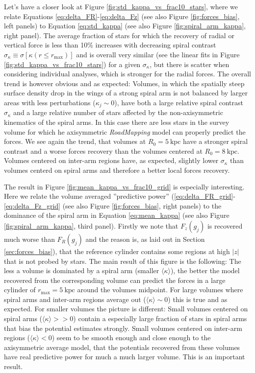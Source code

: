 \documentclass[iop,revtex4,numberedappendix,appendixfloats]{emulateapj}
\newcommand{\RM}{{\sl RoadMapping}}
\begin{document}
Let's have a closer look at Figure \ref{fig:std_kappa_vs_frac10_stars}, where we relate Equations \eqref{eq:delta_FR}-\eqref{eq:delta_Fz} (see also Figure \ref{fig:forces_bias}, left panels) to Equation \eqref{eq:std_kappa} (see also Figure \ref{fig:spiral_arm_kappa}, right panel). The average fraction of stars for which the recovery of radial or vertical force is less than 10\% increases with decreasing spiral contrast $\sigma_\kappa \equiv \sigma[\kappa(r \leq r_\text{max})]$ and is overall very similar (see the linear fits in Figure \ref{fig:std_kappa_vs_frac10_stars}) for a given $\sigma_\kappa$, but there is scatter when considering individual analyses, which is stronger for the radial forces. The overall trend is however obvious and as expected: Volumes, in which the spatially steep surface density drop in the wings of a strong spiral arm is not balanced by larger areas with less perturbations ($\kappa_j \sim 0$), have both a large relative spiral contrast $\sigma_\kappa$ and a large relative number of stars affected by the non-axisymmetric kinematics of the spiral arms. In this case there are less stars in the survey volume for which he axisymmetric \RM{} model can properly predict the forces. We see again the trend, that volumes at $R_0=5~\text{kpc}$ have a stronger spiral contrast and a worse forces recovery than the volumes centered at $R_0=8~\text{kpc}$. Volumes centered on inter-arm regions have, as expected, slightly lower $\sigma_\kappa$ than volumes centerd on spiral arms and therefore a better local forces recovery.

The result in Figure \ref{fig:mean_kappa_vs_frac10_grid} is especially interesting. Here we relate the volume averaged ''predictive power'' (\eqref{eq:delta_FR_grid}-\eqref{eq:delta_Fz_grid} (see also Figure \ref{fig:forces_bias}, right panels) to the dominance of the spiral arm in Equation \eqref{eq:mean_kappa} (see also Figure \ref{fig:spiral_arm_kappa}, third panel). Firstly we note that $F_z(g_j)$ is recovered much worse than $F_R(g_j)$ and the reason is, as laid out in Section \ref{sec:forces_bias}), that the reference cylinder contains some regions at high $|z|$ that is not probed by stars. The main result of this figure is the following: The less a volume is dominated by a spiral arm (smaller $\langle \kappa \rangle$), the better the model recovered from the corresponding volume can predict the forces in a large cylinder of $r_\text{max}=5~\text{kpc}$ around the volumes midpoint. For large volumes where spiral arms and inter-arm regions average out ($\langle \kappa \rangle \sim 0$) this is true and as expected. For smaller volumes the picture is different: Small volumes centered on spiral arms ($\langle \kappa \rangle >> 0$) contain a especially large fraction of stars in spiral arms that bias the potential estimates strongly. Small volumes centered on inter-arm regions ($\langle \kappa \rangle < 0$) seem to be smooth enough and close enough to the axisymmetric average model, that the potentials recovered from these volumes have real predictive power for much a much larger volume. This is an important result.
\end{document}
